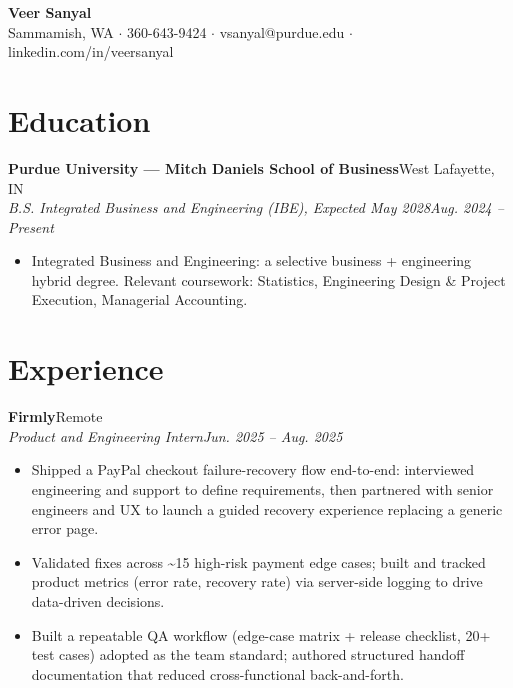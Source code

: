 \documentclass[10pt,letterpaper]{article}
\newcommand{\entry}[4]{%
  \textbf{#1}\hfill #2\\[1pt]
  \textit{#3}\hfill \textit{#4}\\[2pt]
}
\begin{document}
\begin{center}
  {\LARGE \textbf{Veer Sanyal}}\\[3pt]
  Sammamish, WA $\cdot$ 360-643-9424 $\cdot$ vsanyal@purdue.edu $\cdot$ linkedin.com/in/veersanyal
\end{center}

\section*{Education}
\textbf{Purdue University --- Mitch Daniels School of Business}\hfill West Lafayette, IN\\[1pt]
\textit{B.S. Integrated Business and Engineering (IBE), Expected May 2028}\hfill \textit{Aug. 2024 -- Present}
\begin{itemize}
  \item Integrated Business and Engineering: a selective business + engineering hybrid degree. Relevant coursework: Statistics, Engineering Design \& Project Execution, Managerial Accounting.
\end{itemize}

\section*{Experience}
\entry{Firmly}{Remote}{Product and Engineering Intern}{Jun. 2025 -- Aug. 2025}
\begin{itemize}
  \item Shipped a PayPal checkout failure-recovery flow end-to-end: interviewed engineering and support to define requirements, then partnered with senior engineers and UX to launch a guided recovery experience replacing a generic error page.
  \item Validated fixes across \textasciitilde15 high-risk payment edge cases; built and tracked product metrics (error rate, recovery rate) via server-side logging to drive data-driven decisions.
  \item Built a repeatable QA workflow (edge-case matrix + release checklist, 20+ test cases) adopted as the team standard; authored structured handoff documentation that reduced cross-functional back-and-forth.
\end{itemize}
\end{document}
